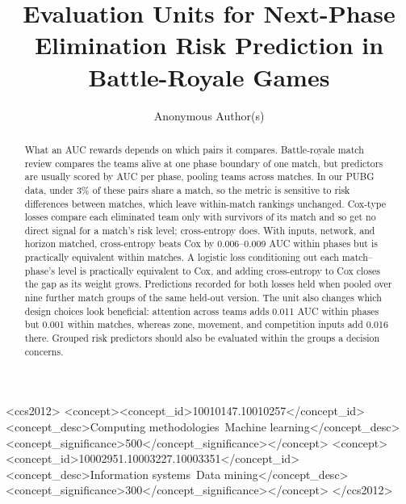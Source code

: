 \documentclass[sigconf,anonymous]{acmart}
\begin{document}
\title{Evaluation Units for Next-Phase Elimination Risk Prediction in Battle-Royale Games}
\renewcommand{\shorttitle}{Evaluation Units for Next-Phase Elimination Prediction}

\author{Anonymous Author(s)}

\begin{abstract}
What an AUC rewards depends on which pairs it compares. Battle-royale match review compares the teams alive at one phase boundary of one match, but predictors are usually scored by AUC per phase, pooling teams across matches. In our PUBG data, under 3\% of these pairs share a match, so the metric is sensitive to risk differences between matches, which leave within-match rankings unchanged. Cox-type losses compare each eliminated team only with survivors of its match and so get no direct signal for a match's risk level; cross-entropy does. With inputs, network, and horizon matched, cross-entropy beats Cox by 0.006--0.009 AUC within phases but is practically equivalent within matches. A logistic loss conditioning out each match--phase's level is practically equivalent to Cox, and adding cross-entropy to Cox closes the gap as its weight grows. Predictions recorded for both losses held when pooled over nine further match groups of the same held-out version. The unit also changes which design choices look beneficial: attention across teams adds 0.011 AUC within phases but 0.001 within matches, whereas zone, movement, and competition inputs add 0.016 there. Grouped risk predictors should also be evaluated within the groups a decision concerns.
\end{abstract}
\begin{CCSXML}
<ccs2012>
<concept><concept_id>10010147.10010257</concept_id><concept_desc>Computing methodologies~Machine learning</concept_desc><concept_significance>500</concept_significance></concept>
<concept><concept_id>10002951.10003227.10003351</concept_id><concept_desc>Information systems~Data mining</concept_desc><concept_significance>300</concept_significance></concept>
</ccs2012>
\end{CCSXML}
\maketitle
\end{document}
